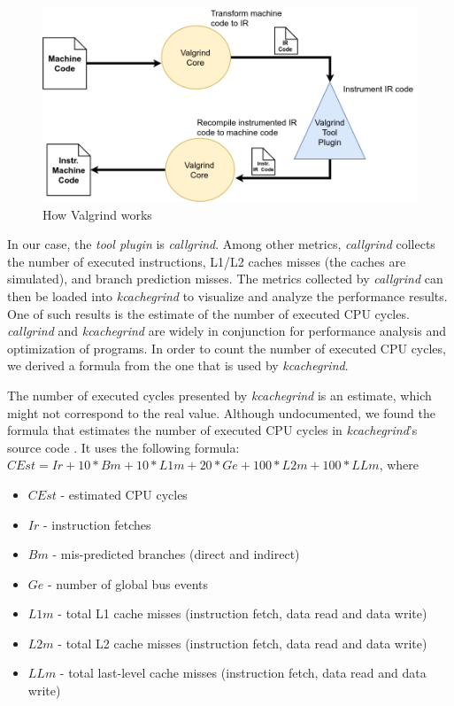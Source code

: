 \begin{figure}
  \centering
  \includegraphics[width=1.0\textwidth]{img/how_valgrind_works.png}
  \centering \caption{\label{fig:how_valgrind_works} How Valgrind works}
\end{figure}

In our case, the \textit{tool plugin} is \textit{callgrind}. Among other metrics, \textit{callgrind}
collects the number of executed instructions, L1/L2 caches misses (the caches are simulated), and branch
prediction misses. The metrics collected by \textit{callgrind} can then be loaded into \textit{kcachegrind}
to visualize and analyze the performance results. One of such results is the estimate of the number of executed CPU cycles.
\textit{callgrind} and \textit{kcachegrind} are widely in conjunction for performance analysis and optimization
of programs. In order to count the number of executed CPU cycles, we derived a formula from
the one that is used by \textit{kcachegrind}.

The number of executed cycles
presented by \textit{kcachegrind} is an estimate, which might not correspond to the real value.
Although undocumented, we found the formula that estimates the number of executed CPU cycles in
\textit{kcachegrind}'s source code \cite{cachegrind_source:online}.
It uses the
following formula: $CEst = Ir + 10*Bm + 10*L1m + 20*Ge + 100*L2m + 100*LLm$, where

\begin{itemize}
  \item $CEst$ - estimated CPU cycles
  \item $Ir$ - instruction fetches
  \item $Bm$ -  mis-predicted branches (direct and indirect)
  \item $Ge$ - number of global bus events
  \item $L1m$ - total L1 cache misses (instruction fetch, data read and data write)
  \item $L2m$ - total L2 cache misses (instruction fetch, data read and data write)
  \item $LLm$ - total last-level cache misses (instruction fetch, data read and data write)
\end{itemize}


